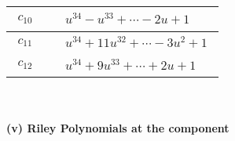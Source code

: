 \documentclass[1p]{elsarticle_modified}
\theoremstyle{definition}
\begin{document}
\begin{tabular}{m{50pt}|m{274pt}}
\hline $$\begin{aligned}c_{10}\end{aligned}$$&$\begin{aligned}
&u^{34}- u^{33}+\cdots-2 u+1
\end{aligned}$\\
\hline $$\begin{aligned}c_{11}\end{aligned}$$&$\begin{aligned}
&u^{34}+11 u^{32}+\cdots-3 u^2+1
\end{aligned}$\\
\hline $$\begin{aligned}c_{12}\end{aligned}$$&$\begin{aligned}
&u^{34}+9 u^{33}+\cdots+2 u+1
\end{aligned}$\\
\hline
\end{tabular}\\~\\
\newpage\renewcommand{\arraystretch}{1}
\flushleft \textbf{(v) Riley Polynomials at the component}\newline \\
\end{document}
